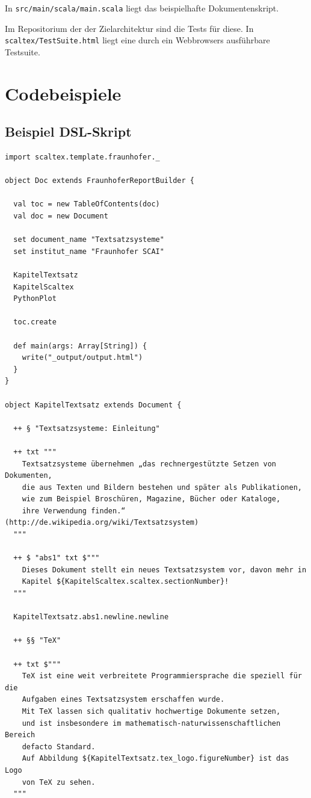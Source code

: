 In \verb+src/main/scala/main.scala+ liegt das
beispielhafte Dokumentenskript.

Im Repositorium der der Zielarchitektur sind die Tests für diese.
In \verb+scaltex/TestSuite.html+ liegt eine durch ein Webbrowsers
ausführbare Testsuite.


\chapter{Codebeispiele}

\section{Beispiel DSL-Skript}\label{sec-api-resultat}

\begin{lstlisting}[label=dsl-skript,caption=Ausführliches Scala DSL Dokument-Skript.]
import scaltex.template.fraunhofer._

object Doc extends FraunhoferReportBuilder {

  val toc = new TableOfContents(doc)
  val doc = new Document

  set document_name "Textsatzsysteme"
  set institut_name "Fraunhofer SCAI"

  KapitelTextsatz
  KapitelScaltex
  PythonPlot

  toc.create

  def main(args: Array[String]) {
    write("_output/output.html")
  }
}

object KapitelTextsatz extends Document {

  ++ § "Textsatzsysteme: Einleitung"

  ++ txt """
    Textsatzsysteme übernehmen „das rechnergestützte Setzen von Dokumenten,
    die aus Texten und Bildern bestehen und später als Publikationen,
    wie zum Beispiel Broschüren, Magazine, Bücher oder Kataloge,
    ihre Verwendung finden.“ (http://de.wikipedia.org/wiki/Textsatzsystem)
  """

  ++ $ "abs1" txt $"""
    Dieses Dokument stellt ein neues Textsatzsystem vor, davon mehr in
    Kapitel ${KapitelScaltex.scaltex.sectionNumber}!
  """

  KapitelTextsatz.abs1.newline.newline

  ++ §§ "TeX"

  ++ txt $"""
    TeX ist eine weit verbreitete Programmiersprache die speziell für die
    Aufgaben eines Textsatzsystem erschaffen wurde.
    Mit TeX lassen sich qualitativ hochwertige Dokumente setzen,
    und ist insbesondere im mathematisch-naturwissenschaftlichen Bereich
    defacto Standard.
    Auf Abbildung ${KapitelTextsatz.tex_logo.figureNumber} ist das Logo
    von TeX zu sehen.
  """


\end{lstlisting}
